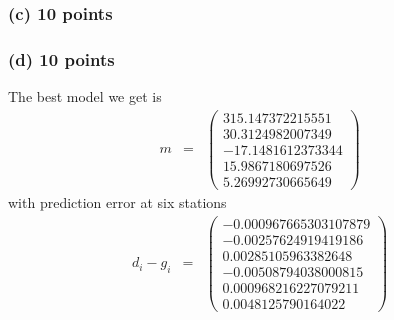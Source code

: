 \documentclass[11pt]{article}
\begin{document}
\subsubsection*{(c) 10 points}


\clearpage
\subsubsection*{(d) 10 points}
The best model we get is
\begin{eqnarray*}
  m & = & 
  \left(
  \begin{array}{c}
      315.147372215551 \\
          30.3124982007349 \\
         -17.1481612373344 \\
          15.9867180697526 \\
          5.26992730665649 
  \end{array}
  \right) 
\end{eqnarray*}
with prediction error at six stations
\begin{eqnarray*}
  d_i - g_i & = & 
  \left(
  \begin{array}{c}
       -0.000967665303107879 \\
      -0.00257624919419186\\
       0.00285105963382648\\
      -0.00508794038000815\\
      0.000968216227079211\\
        0.0048125790164022
  \end{array}
  \right) 
\end{eqnarray*}
\end{document}

